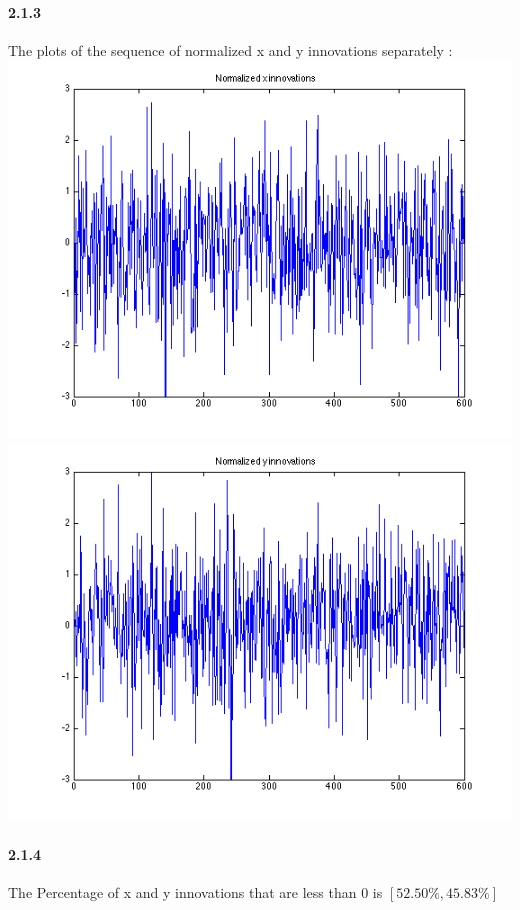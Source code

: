 \documentclass[a4paper]{article}
\begin{document}
\paragraph{2.1.3 } The plots of the sequence of normalized x and y innovations separately : \\
\includegraphics[scale=.4]{target_2_x_inno_q_0.png}
\includegraphics[scale=.4]{target_2_y_inno_q_0.png} \\

\paragraph{2.1.4 } The Percentage of x and y innovations that are less than 0 is $[ 52.50\%, 45.83\% ]$ \\
\end{document}
